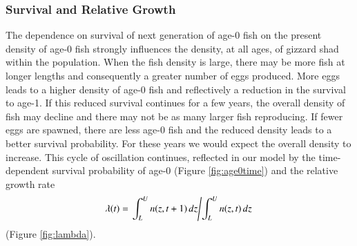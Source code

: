 \documentclass[preprint,review,12pt,authoryear]{elsarticle}
\begin{document}
\subsubsection{Survival and Relative Growth}
The dependence on survival of next generation of age-0 fish on the present density of age-0 fish strongly influences the density, at all ages, of gizzard shad within the population. When the fish density is large, there may be more fish at longer lengths and consequently a greater number of eggs produced.  More eggs leads to a higher density of age-0 fish and reflectively a reduction in the survival to age-1.  If this reduced survival continues for a few years, the overall density of fish may decline and there may not be as many larger fish reproducing.  If fewer eggs are spawned, there are less age-0 fish and the reduced density leads to a better survival probability.  For these years we would expect the overall density to increase.  This cycle of oscillation continues, reflected in our model by the time-dependent survival probability of age-0 (Figure \ref{fig:age0time}) and the relative growth rate 
$$ \lambda(t) = \left. \int_L^U n(z,t+1) \, dz \middle/ \int_L^U n(z,t) \, dz \right.$$ (Figure \ref{fig:lambda}).
\end{document}
